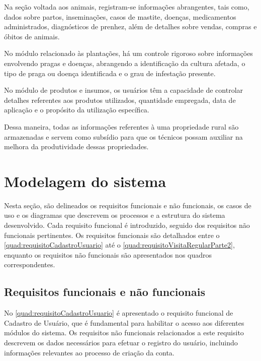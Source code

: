 Na seção voltada aos animais, registram-se informações abrangentes, tais como, dados sobre partos, inseminações, casos de mastite, doenças, medicamentos administrados, diagnósticos de prenhez, além de detalhes sobre vendas, compras e óbitos de animais.

No módulo relacionado às plantações, há um controle rigoroso sobre informações envolvendo pragas e doenças, abrangendo a identificação da cultura afetada, o tipo de praga ou doença identificada e o grau de infestação presente.

No módulo de produtos e insumos, os usuários têm a capacidade de controlar detalhes referentes aos produtos utilizados, quantidade empregada, data de aplicação e o propósito da utilização específica.

Dessa maneira, todas as informações referentes à uma propriedade rural são armazenadas e servem como subsídio para que os técnicos possam auxiliar na melhora da produtividade dessas propriedades.

\section{Modelagem do sistema}\label{sec:modelagemSistema}

Nesta seção, são delineados os requisitos funcionais e não funcionais, os casos de uso e os diagramas que descrevem os processos e a estrutura do sistema desenvolvido. Cada requisito funcional é introduzido, seguido dos requisitos não funcionais pertinentes.
Os requisitos funcionais são detalhados entre o \autoref{quad:requisitoCadastroUsuario} até o \autoref{quad:requisitoVisitaRegularParte2}, enquanto os requisitos não funcionais são apresentados nos quadros correspondentes.

\subsection{Requisitos funcionais e não funcionais}\label{subsec:requisitosFuncionaisNaoFuncionais}

No \autoref{quad:requisitoCadastroUsuario} é apresentado o requisito funcional de Cadastro de Usuário, que é fundamental para habilitar o acesso aos diferentes módulos do sistema. Os requisitos não funcionais relacionados a este requisito descrevem os dados necessários para efetuar o registro do usuário, incluindo informações relevantes ao processo de criação da conta.

